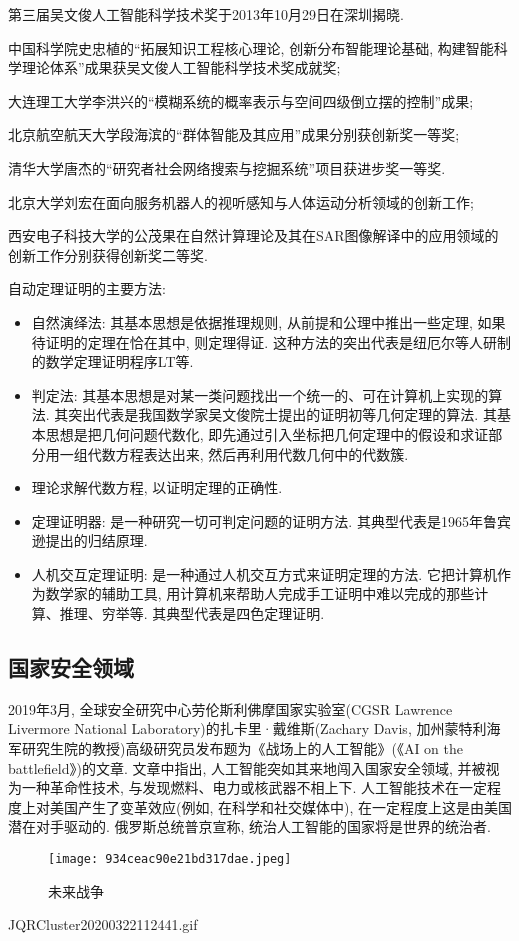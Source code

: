 \begin{center}
\begin{minipage}{0.8\textwidth}
  第三届吴文俊人工智能科学技术奖于2013年10月29日在深圳揭晓.

   中国科学院史忠植的“拓展知识工程核心理论, 创新分布智能理论基础, 构建智能科学理论体系”成果获吴文俊人工智能科学技术奖成就奖;

  大连理工大学李洪兴的“模糊系统的概率表示与空间四级倒立摆的控制”成果;

  北京航空航天大学段海滨的“群体智能及其应用”成果分别获创新奖一等奖;

  清华大学唐杰的“研究者社会网络搜索与挖掘系统”项目获进步奖一等奖.

  北京大学刘宏在面向服务机器人的视听感知与人体运动分析领域的创新工作;

  西安电子科技大学的公茂果在自然计算理论及其在SAR图像解译中的应用领域的创新工作分别获得创新奖二等奖.
\end{minipage}
\end{center}
自动定理证明的主要方法:
\begin{itemize}
\item 自然演绎法: 其基本思想是依据推理规则, 从前提和公理中推出一些定理, 如果待证明的定理在恰在其中, 则定理得证. 这种方法的突出代表是纽厄尔等人研制的数学定理证明程序LT等.
\item 判定法: 其基本思想是对某一类问题找出一个统一的、可在计算机上实现的算法. 其突出代表是我国数学家吴文俊院士提出的证明初等几何定理的算法. 其基本思想是把几何问题代数化, 即先通过引入坐标把几何定理中的假设和求证部分用一组代数方程表达出来, 然后再利用代数几何中的代数簇.
\item 理论求解代数方程, 以证明定理的正确性.
\item 定理证明器: 是一种研究一切可判定问题的证明方法. 其典型代表是1965年鲁宾逊提出的归结原理.
\item 人机交互定理证明: 是一种通过人机交互方式来证明定理的方法. 它把计算机作为数学家的辅助工具, 用计算机来帮助人完成手工证明中难以完成的那些计算、推理、穷举等. 其典型代表是四色定理证明.
\end{itemize}
\subsection{\textbf{国家安全领域}}
2019年3月, 全球安全研究中心劳伦斯利佛摩国家实验室(CGSR Lawrence Livermore National Laboratory)的扎卡里·戴维斯(Zachary Davis,  加州蒙特利海军研究生院的教授)高级研究员发布题为《战场上的人工智能》(《AI on the battlefield》)的文章.
文章中指出, 人工智能突如其来地闯入国家安全领域, 并被视为一种革命性技术, 与发现燃料、电力或核武器不相上下. 人工智能技术在一定程度上对美国产生了变革效应(例如, 在科学和社交媒体中), 在一定程度上这是由美国潜在对手驱动的. 俄罗斯总统普京宣称, 统治人工智能的国家将是世界的统治者.
\begin{figure}[htbp]
	\centering
	\texttt{[image: 934ceac90e21bd317dae.jpeg]}
	\caption{未来战争}
   \label{AI:201912020Fig4}
\end{figure}
JQRCluster20200322112441.gif
